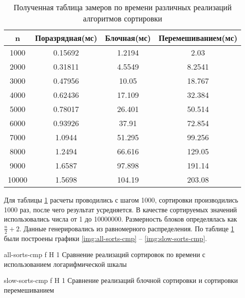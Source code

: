 \begin{table}[ht]
	\centering
	\caption{Полученная таблица замеров по времени различных реализаций алгоритмов сортировки}
	\begin{tabular}{|c|c|c|c|}
		\hline
		n     & Поразрядная(мс) & Блочная(мс) & Перемешиванием(мс) \\ \hline
		1000  & 0.15692         & 1.2194      & 2.03               \\ \hline
		2000  & 0.31811         & 4.5549      & 8.2541             \\ \hline
		3000  & 0.47956         & 10.05       & 18.767             \\ \hline
		4000  & 0.62436         & 17.109      & 32.384             \\ \hline
		5000  & 0.78017         & 26.401      & 50.514             \\ \hline
		6000  & 0.93926         & 37.91       & 72.854             \\ \hline
		7000  & 1.0944          & 51.295      & 99.256             \\ \hline
		8000  & 1.2494          & 66.616      & 129.05             \\ \hline
		9000  & 1.6587          & 97.898      & 191.14             \\ \hline
		10000 & 1.5698          & 104.19      & 203.08             \\ \hline
	\end{tabular}
	\label{t:timings}
\end{table}

Для таблицы \ref{t:timings} расчеты проводились с шагом 1000, сортировки производились 1000 раз, после чего результат усредняется. В качестве сортируемых значений использовались  числа от 1 до 10000000. Размерность блоков определялась как $\frac{n}{2} + 2$. Данные генерировались из равномерного распределения.
По таблице \ref{t:timings} были построены графики \ref{img:all-sorts-cmp} -- \ref{img:slow-sorts-cmp}.

{all-sorts-cmp} %
{f} %
{H} %
{1\textwidth} %
{Сравнение реализаций сортировок по времени с использованием логарифмической шкалы} %


{slow-sorts-cmp} %
{f} %
{H} %
{1\textwidth} %
{Сравнение реализаций блочной сортировки и сортировки перемешиванием} %

